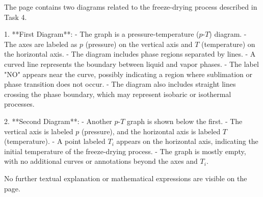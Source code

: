 The page contains two diagrams related to the freeze-drying process described in Task 4.

1. **First Diagram**:  
   - The graph is a pressure-temperature (\( p \)-\( T \)) diagram.  
   - The axes are labeled as \( p \) (pressure) on the vertical axis and \( T \) (temperature) on the horizontal axis.  
   - The diagram includes phase regions separated by lines.  
   - A curved line represents the boundary between liquid and vapor phases.  
   - The label "NO" appears near the curve, possibly indicating a region where sublimation or phase transition does not occur.  
   - The diagram also includes straight lines crossing the phase boundary, which may represent isobaric or isothermal processes.

2. **Second Diagram**:  
   - Another \( p \)-\( T \) graph is shown below the first.  
   - The vertical axis is labeled \( p \) (pressure), and the horizontal axis is labeled \( T \) (temperature).  
   - A point labeled \( T_i \) appears on the horizontal axis, indicating the initial temperature of the freeze-drying process.  
   - The graph is mostly empty, with no additional curves or annotations beyond the axes and \( T_i \).

No further textual explanation or mathematical expressions are visible on the page.